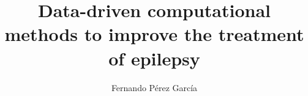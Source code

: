 \makeatletter
\title{Data-driven computational methods to improve the treatment of epilepsy}\let\thetitle\@title
\author{Fernando Pérez García}\let\theauthor\@author
\makeatother

